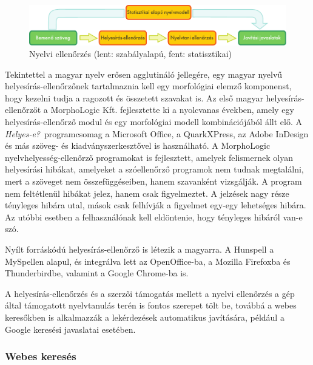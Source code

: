 \begin{multicols}{2}
  \begin{figure}[htb]
    \center
    \includegraphics[width=\textwidth]{../_media/hungarian/language_checking}
    \caption{Nyelvi ellenőrzés (lent: szabályalapú, fent: statisztikai)}
    \label{fig:langcheckingaarch_de}
  \end{figure}

  Tekintettel a magyar nyelv erősen agg\-lu\-ti\-ná\-ló jellegére, egy magyar nyelvű helyesírás-ellenőrzőnek tartalmaznia kell egy morfológiai elemző komponenst, hogy kezelni tudja a ragozott és összetett sza\-va\-kat is. Az első magyar helyesírás-ellenőrzőt a MorphoLogic Kft. \cite{morpho} fej\-lesz\-tet\-te ki a nyolcvanas években, amely egy helyesírás-ellenőrző modul és egy morfológiai modell kombinációjából állt elő. A \textit{Helyes-e?}\ programcsomag a Microsoft Office, a QuarkXPress, az Adobe InDesign és más szöveg- és ki\-ad\-vány\-szer\-kesz\-tő\-vel is használható. A MorphoLogic nyelvhelyesség-ellenőrző programokat is fejlesztett, amelyek felismernek olyan he\-lyes\-írá\-si hibákat, amelyeket a szóellenőrző programok nem tudnak megtalálni, mert a szöveget nem összefüggéseiben, hanem szavanként vizsgálják. A program nem feltétlenül hibákat jelez, hanem csak figyelmeztet. A jelzések nagy része tény\-le\-ges hibára utal, mások csak felhívják a figyelmet egy-egy lehetséges hibára. Az utóbbi esetben a felhasználónak kell eldöntenie, hogy tényleges hibáról van-e szó.

  Nyílt forráskódú helyesírás-ellenőrző is létezik a magyarra. A Hunspell \cite{hunspell} a MySpellen alapul, és integrálva lett az OpenOffice-ba, a Mozilla Firefoxba és Thunderbirdbe, valamint a Google Chrome-ba is.

  A helyesírás-ellenőrzés és a szerzői támogatás mellett a nyelvi ellenőrzés a gép által támogatott nyelvtanulás terén is fontos szerepet tölt be, továbbá a webes keresőkben is alkalmazzák a lekérdezések automatikus javítására, például a Google keresési javaslatai esetében.

  \subsubsection{Webes keresés}


\end{multicols}
